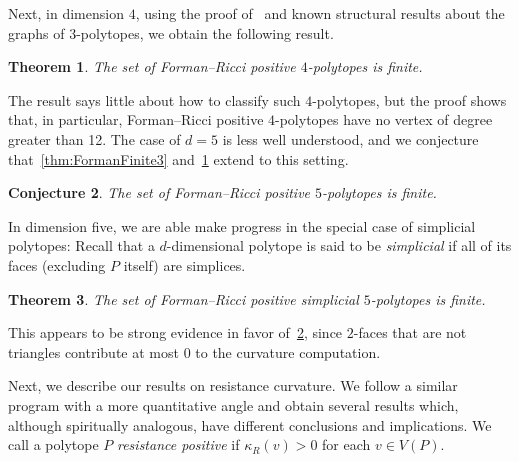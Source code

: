 \documentclass[11pt,a4paper]{amsart}
\newcommand{\resistance}[1]{\kappa_R\left({#1}\right)}
\newtheorem{theorem}{Theorem}[section]
\newtheorem{conjecture}[theorem]{Conjecture}
\begin{document}
Next, in dimension $4$, using the proof of~ and known structural results about the graphs of $3$-polytopes, we obtain the following result.

\begin{theorem}\label{thm:FormanFinite4}
    The set of Forman--Ricci positive $4$-polytopes is finite.
\end{theorem}

The result says little about how to classify such $4$-polytopes, but the proof shows that, in particular, Forman--Ricci positive $4$-polytopes have no vertex of degree greater than 12. The case of $d=5$ is less well understood, and we conjecture that~\cref{thm:FormanFinite3} and~\cref{thm:FormanFinite4} extend to this setting.

\begin{conjecture}\label{conjecture:5-polytopes}
    The set of Forman--Ricci positive $5$-polytopes is finite.
\end{conjecture}

In dimension five, we are able make progress in the special case of simplicial polytopes: Recall that a $d$-dimensional polytope is said to be \emph{simplicial} if all of its faces (excluding $P$ itself) are simplices.

\begin{theorem}
    The set of Forman--Ricci positive simplicial $5$-polytopes is finite.
\end{theorem}

This appears to be strong evidence in favor of~\cref{conjecture:5-polytopes}, since $2$-faces that are not triangles contribute at most $0$ to the curvature computation.

Next, we describe our results on resistance curvature. We follow a similar program with a more quantitative angle and obtain several results which, although spiritually analogous, have different conclusions and implications. We call a polytope $P$ \emph{resistance positive} if $\resistance{v} > 0$ for each $v\in V(P)$.
\end{document}
